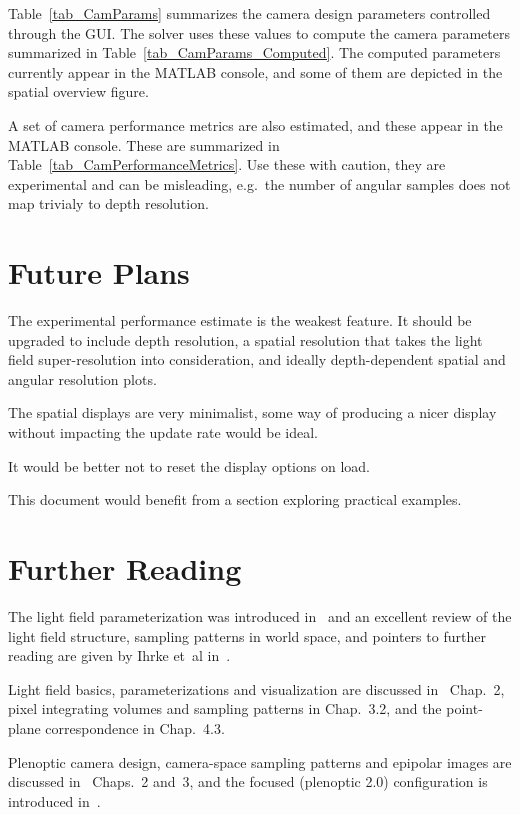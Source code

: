 \documentclass[onecolumn]{article}
\begin{document}
Table~\ref{tab_CamParams} summarizes the camera design parameters controlled through the GUI.  The solver uses these values to compute the camera parameters summarized in Table~\ref{tab_CamParams_Computed}.  The computed parameters currently appear in the MATLAB console, and some of them are depicted in the spatial overview figure.

A set of camera performance metrics are also estimated, and these appear in the MATLAB console. These are summarized in Table~\ref{tab_CamPerformanceMetrics}.  Use these with caution, they are experimental and can be misleading, e.g.~the number of angular samples does not map trivialy to depth resolution.


\section{Future Plans}

The experimental performance estimate is the weakest feature.  It should be upgraded to include depth resolution, a spatial resolution that takes the light field super-resolution into consideration, and ideally depth-dependent spatial and angular resolution plots.

The spatial displays are very minimalist, some way of producing a nicer display without impacting the update rate would be ideal. 

It would be better not to reset the display options on load.

This document would benefit from a section exploring practical examples.


\section{Further Reading}
\label{sect_FurtherReading}

The light field parameterization was introduced in~\cite{levoy1996light} and an excellent review of the light field structure, sampling patterns in world space, and pointers to further reading are given by Ihrke et~al in~\cite{ihrke2016principles}.  

Light field basics, parameterizations and visualization are discussed in~\cite{dansereau2014Thesis} Chap.~2, pixel integrating volumes and sampling patterns in Chap.~3.2, and the point-plane correspondence in Chap.~4.3.

Plenoptic camera design, camera-space sampling patterns and epipolar images are discussed in~\cite{ng2006digital} Chaps.~2 and~3, and the focused (plenoptic 2.0) configuration is introduced in~\cite{lumsdaine2009focused}.

\newpage


\end{document}
